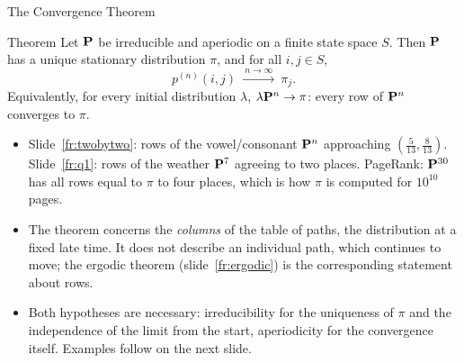 \begin{frame}{The Convergence Theorem}
  \label{fr:conv}
  \small
  \begin{block}{Theorem}
    Let $\mathbf{P}$ be irreducible and aperiodic on a finite state space $S$. Then $\mathbf{P}$ has a unique stationary distribution $\pi$, and for all $i,j\in S$,
    \[
      p^{(n)}(i,j)\ \xrightarrow{\ n\to\infty\ }\ \pi_j .
    \]
    Equivalently, for every initial distribution $\lambda$, $\lambda\mathbf{P}^n\to\pi$: every row of $\mathbf{P}^n$ converges to $\pi$.
  \end{block}
  \begin{itemize}
    \item Slide~\ref{fr:twobytwo}: rows of the vowel/consonant $\mathbf{P}^n$ approaching $(\tfrac5{13},\tfrac8{13})$. Slide~\ref{fr:q1}: rows of the weather $\mathbf{P}^7$ agreeing to two places. PageRank: $\mathbf{P}^{30}$ has all rows equal to $\pi$ to four places, which is how $\pi$ is computed for $10^{10}$ pages.
    \item The theorem concerns the \emph{columns} of the table of paths, the distribution at a fixed late time. It does not describe an individual path, which continues to move; the ergodic theorem (slide~\ref{fr:ergodic}) is the corresponding statement about rows.
    \item Both hypotheses are necessary: irreducibility for the uniqueness of $\pi$ and the independence of the limit from the start, aperiodicity for the convergence itself. Examples follow on the next slide.
  \end{itemize}
\end{frame}

